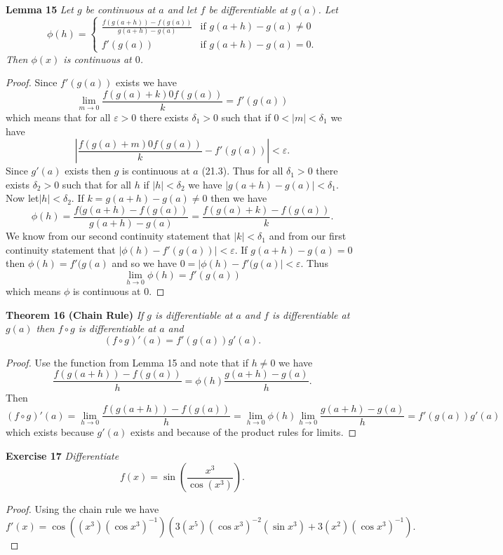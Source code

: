 \documentclass{article}
\begin{document}
\begin{flushleft}
\textbf{Lemma 15}
\textsl{Let $g$ be continuous at $a$ and let $f$ be differentiable at $g(a)$. Let
\[
\phi (h) =
\begin{cases}
\frac{f(g(a+h)) - f(g(a))}{g(a+h)-g(a)} & \text{if $g(a+h) - g(a) \neq 0$} \\
f'(g(a)) & \text{if $g(a+h) - g(a) = 0$}.
\end{cases}
\]
Then $\phi (x)$ is continuous at $0$.}
\begin{proof}
Since $f'(g(a))$ exists we have
\[
\lim_{m \rightarrow 0} \frac{f(g(a)+k) 0 f(g(a))}{k} = f'(g(a))
\]
which means that for all $\varepsilon > 0$ there exists $\delta_1 > 0$ such that if $0 < |m| < \delta_1$ we have
\[
\left | \frac{f(g(a) + m) 0 f(g(a))}{k} - f'(g(a)) \right | < \varepsilon.
\]
Since $g'(a)$ exists then $g$ is continuous at $a$ (21.3). Thus for all $\delta_1 > 0$ there exists $\delta_2 > 0$ such that for all $h$ if $|h| < \delta_2$ we have $|g(a+h) - g(a)| < \delta_1$. Now let$|h| < \delta_2$. If $k = g(a+h) - g(a) \neq 0$ then we have
\[
\phi (h) = \frac{f(g(a+h) - f(g(a))}{g(a+h) - g(a)} = \frac{f(g(a)+k) - f(g(a))}{k}.
\]
We know from our second continuity statement that $|k| < \delta_1$ and from our first continuity statement that $|\phi(h) - f'(g(a))| < \varepsilon$. If $g(a+h) - g(a) = 0$ then $\phi(h) = f'(g(a)$ and so we have $0 = |\phi(h) - f'(g(a)| < \varepsilon$. Thus
\[
\lim_{h \rightarrow 0} \phi (h) = f'(g(a))
\]
which means $\phi$ is continuous at $0$.
\end{proof}

\textbf{Theorem 16 (Chain Rule)}
\textsl{If $g$ is differentiable at $a$ and $f$ is differentiable at $g(a)$ then $f \circ g$ is differentiable at $a$ and
\[
(f \circ g)' (a) = f'(g(a)) g'(a).
\]}
\begin{proof}
Use the function from Lemma 15 and note that if $h \neq 0$ we have
\[
\frac{f(g(a+h)) - f(g(a))}{h} = \phi(h) \frac{g(a+h) - g(a)}{h}.
\]
Then
\[
(f \circ g)' (a) = \lim_{h \rightarrow 0} \frac{f(g(a+h)) - f(g(a))}{h} = \lim_{h \rightarrow 0} \phi(h) \lim_{h \rightarrow 0} \frac{g(a+h) - g(a)}{h} = f'(g(a)) g'(a)
\]
which exists because $g'(a)$ exists and because of the product rules for limits.
\end{proof}

\textbf{Exercise 17}
\textsl{Differentiate
\[
f(x) = \sin \left ( \frac{x^3}{\cos \left (x^3 \right )} \right ).
\]}
\begin{proof}
Using the chain rule we have
\[
f'(x) = \cos \left ( (x^3)(\cos x^3)^{-1} \right ) \left ( 3(x^5)(\cos x^3)^{-2}(\sin x^3) + 3(x^2)(\cos x^3)^{-1} \right ).
\]
\end{proof}


\end{flushleft}
\end{document}
